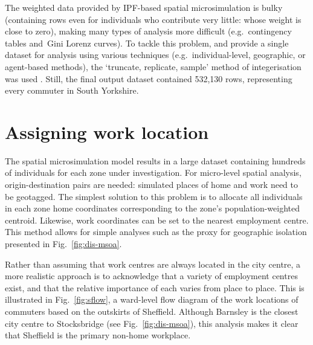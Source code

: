 The weighted data provided by IPF-based spatial microsimulation is bulky
(containing rows even for individuals who contribute very little: whose
weight is close to zero), making many types of analysis more difficult
(e.g.~contingency tables and~Gini Lorenz curves). To tackle
this problem, and provide a single
dataset for analysis using various techniques (e.g.~individual-level,
geographic, or agent-based methods), the `truncate, replicate, sample' method
of integerisation was used \citet{Lovelace2013-trs}. Still, the final output
dataset contained 532,130 rows, representing every commuter in South Yorkshire.

\section{Assigning work location}
\label{s:workdes}
The spatial microsimulation model results in a large dataset containing
hundreds of individuals for each zone under investigation. For micro-level
spatial analysis, origin-destination pairs are needed: simulated
places of home and work need to be geotagged. The simplest solution
to this problem is to allocate all individuals in each zone home coordinates
corresponding to the zone's population-weighted centroid. Likewise, work coordinates
can be set to the nearest employment centre. This method allows
for simple analyses such as the proxy for geographic
isolation presented in Fig.~\ref{fig:dis-msoa}.

Rather than assuming that work centres are always located in the city
centre, a more realistic approach is to acknowledge that a variety of
employment centres exist, and that the relative importance of each varies from
place to place. This is illustrated in Fig.~\ref{fig:sflow}, a ward-level
flow diagram of
the work locations of commuters based on the outskirts of Sheffield. Although
Barnsley is the closest city centre to Stocksbridge (see
Fig.~\ref{fig:dis-msoa}), this analysis makes it clear that Sheffield is the
primary non-home workplace.

